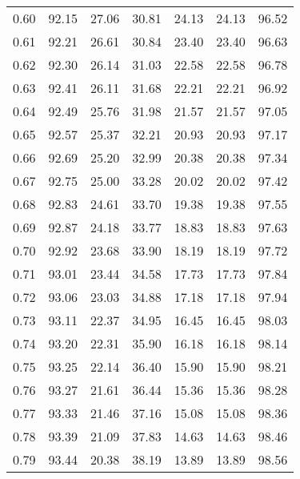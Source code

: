 \begin{tabular}{|c|c|c|c|c|c|c|}
      0.60 &     92.15 &     27.06 &      30.81 &   24.13 &      24.13 &         96.52 \\
      0.61 &     92.21 &     26.61 &      30.84 &   23.40 &      23.40 &         96.63 \\
      0.62 &     92.30 &     26.14 &      31.03 &   22.58 &      22.58 &         96.78 \\
      0.63 &     92.41 &     26.11 &      31.68 &   22.21 &      22.21 &         96.92 \\
      0.64 &     92.49 &     25.76 &      31.98 &   21.57 &      21.57 &         97.05 \\
      0.65 &     92.57 &     25.37 &      32.21 &   20.93 &      20.93 &         97.17 \\
      0.66 &     92.69 &     25.20 &      32.99 &   20.38 &      20.38 &         97.34 \\
      0.67 &     92.75 &     25.00 &      33.28 &   20.02 &      20.02 &         97.42 \\
      0.68 &     92.83 &     24.61 &      33.70 &   19.38 &      19.38 &         97.55 \\
      0.69 &     92.87 &     24.18 &      33.77 &   18.83 &      18.83 &         97.63 \\
      0.70 &     92.92 &     23.68 &      33.90 &   18.19 &      18.19 &         97.72 \\
      0.71 &     93.01 &     23.44 &      34.58 &   17.73 &      17.73 &         97.84 \\
      0.72 &     93.06 &     23.03 &      34.88 &   17.18 &      17.18 &         97.94 \\
      0.73 &     93.11 &     22.37 &      34.95 &   16.45 &      16.45 &         98.03 \\
      0.74 &     93.20 &     22.31 &      35.90 &   16.18 &      16.18 &         98.14 \\
      0.75 &     93.25 &     22.14 &      36.40 &   15.90 &      15.90 &         98.21 \\
      0.76 &     93.27 &     21.61 &      36.44 &   15.36 &      15.36 &         98.28 \\
      0.77 &     93.33 &     21.46 &      37.16 &   15.08 &      15.08 &         98.36 \\
      0.78 &     93.39 &     21.09 &      37.83 &   14.63 &      14.63 &         98.46 \\
      0.79 &     93.44 &     20.38 &      38.19 &   13.89 &      13.89 &         98.56 \\

\end{tabular}
